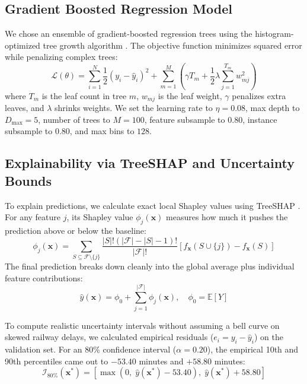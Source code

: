 \documentclass[11pt,a4paper]{article}
\begin{document}
\subsection{Gradient Boosted Regression Model}
We chose an ensemble of gradient-boosted regression trees using the histogram-optimized tree growth algorithm \cite{chen2016xgboost}. The objective function minimizes squared error while penalizing complex trees:
\begin{equation}
\mathcal{L}(\theta) = \sum_{i=1}^N \frac{1}{2}\left(y_i - \hat{y}_i\right)^2 + \sum_{m=1}^M \left( \gamma T_m + \frac{1}{2}\lambda \sum_{j=1}^{T_m} w_{mj}^2 \right)
\end{equation}
where $T_m$ is the leaf count in tree $m$, $w_{mj}$ is the leaf weight, $\gamma$ penalizes extra leaves, and $\lambda$ shrinks weights. We set the learning rate to $\eta = 0.08$, max depth to $D_{\max} = 5$, number of trees to $M = 100$, feature subsample to $0.80$, instance subsample to $0.80$, and max bins to $128$.

\subsection{Explainability via TreeSHAP and Uncertainty Bounds}
To explain predictions, we calculate exact local Shapley values using TreeSHAP \cite{lundberg2020local}. For any feature $j$, its Shapley value $\phi_j(\mathbf{x})$ measures how much it pushes the prediction above or below the baseline:
\begin{equation}
\phi_j(\mathbf{x}) = \sum_{S \subseteq \mathcal{F} \setminus \{j\}} \frac{|S|!(|\mathcal{F}| - |S| - 1)!}{|\mathcal{F}|!} \left[ f_{\mathbf{x}}(S \cup \{j\}) - f_{\mathbf{x}}(S) \right]
\end{equation}
The final prediction breaks down cleanly into the global average plus individual feature contributions:
\begin{equation}
\hat{y}(\mathbf{x}) = \phi_0 + \sum_{j=1}^{|\mathcal{F}|} \phi_j(\mathbf{x}), \quad \phi_0 = \mathbb{E}[Y]
\end{equation}

To compute realistic uncertainty intervals without assuming a bell curve on skewed railway delays, we calculated empirical residuals ($e_i = y_i - \hat{y}_i$) on the validation set. For an 80\% confidence interval ($\alpha = 0.20$), the empirical 10th and 90th percentiles came out to $-53.40$ minutes and $+58.80$ minutes:
\begin{equation}
\mathcal{I}_{80\%}(\mathbf{x}^*) = \left[ \max\left(0, \; \hat{y}(\mathbf{x}^*) - 53.40\right), \; \hat{y}(\mathbf{x}^*) + 58.80 \right]
\end{equation}
\end{document}
